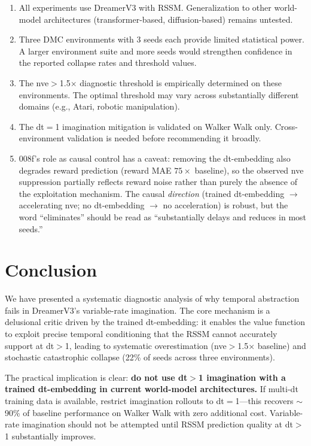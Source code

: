 \documentclass[letterpaper]{article}
\begin{document}
\begin{enumerate}
    \item All experiments use DreamerV3 with RSSM.
    Generalization to other world-model architectures (transformer-based, diffusion-based) remains untested.
    \item Three DMC environments with 3 seeds each provide limited statistical power.
    A larger environment suite and more seeds would strengthen confidence in the reported collapse rates and threshold values.
    \item The nve$>$1.5$\times$ diagnostic threshold is empirically determined on these environments.
    The optimal threshold may vary across substantially different domains (e.g., Atari, robotic manipulation).
    \item The dt$=$1 imagination mitigation is validated on Walker Walk only.
    Cross-environment validation is needed before recommending it broadly.
    \item 008f's role as causal control has a caveat: removing the dt-embedding also degrades reward prediction (reward MAE $75\times$ baseline), so the observed nve suppression partially reflects reward noise rather than purely the absence of the exploitation mechanism.
    The causal \emph{direction} (trained dt-embedding $\to$ accelerating nve; no dt-embedding $\to$ no acceleration) is robust, but the word ``eliminates'' should be read as ``substantially delays and reduces in most seeds.''
\end{enumerate}

\section{Conclusion}
\label{sec:conclusion}

We have presented a systematic diagnostic analysis of why temporal abstraction fails in DreamerV3's variable-rate imagination.
The core mechanism is a delusional critic driven by the trained dt-embedding: it enables the value function to exploit precise temporal conditioning that the RSSM cannot accurately support at dt$>$1, leading to systematic overestimation (nve$>$1.5$\times$ baseline) and stochastic catastrophic collapse (22\% of seeds across three environments).

The practical implication is clear: \textbf{do not use dt$>$1 imagination with a trained dt-embedding in current world-model architectures.}
If multi-dt training data is available, restrict imagination rollouts to dt$=$1---this recovers $\sim$90\% of baseline performance on Walker Walk with zero additional cost.
Variable-rate imagination should not be attempted until RSSM prediction quality at dt$>$1 substantially improves.
\end{document}
